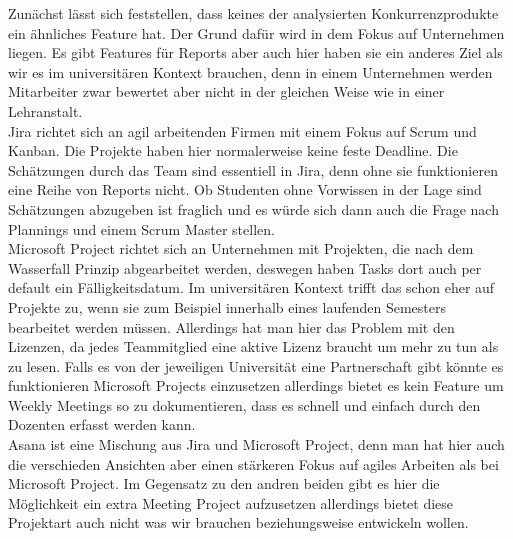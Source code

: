 Zunächst lässt sich feststellen, dass keines der analysierten Konkurrenzprodukte ein ähnliches Feature hat. Der Grund dafür wird in dem Fokus auf Unternehmen liegen. Es gibt Features für Reports aber auch hier haben sie ein anderes Ziel als wir es im universitären Kontext brauchen, denn in einem Unternehmen werden Mitarbeiter zwar bewertet aber nicht in der gleichen Weise wie in einer Lehranstalt.\\
Jira richtet sich an agil arbeitenden Firmen mit einem Fokus auf Scrum und Kanban. Die Projekte haben hier normalerweise keine feste Deadline. Die Schätzungen durch das Team sind essentiell in Jira, denn ohne sie funktionieren eine Reihe von Reports nicht. Ob Studenten ohne Vorwissen in der Lage sind Schätzungen abzugeben ist fraglich und es würde sich dann auch die Frage 
nach Plannings und einem Scrum Master stellen.\\
Microsoft Project richtet sich an Unternehmen mit Projekten, die nach dem Wasserfall Prinzip abgearbeitet werden, deswegen haben Tasks dort auch per default ein Fälligkeitsdatum. Im universitären Kontext trifft das schon eher auf Projekte zu, wenn sie zum Beispiel innerhalb eines laufenden Semesters bearbeitet werden müssen.  Allerdings hat man hier das Problem mit den Lizenzen, da jedes Teammitglied eine aktive Lizenz braucht um mehr zu tun als zu lesen. Falls es von der jeweiligen Universität eine Partnerschaft gibt könnte es funktionieren Microsoft Projects einzusetzen allerdings bietet es kein Feature um Weekly Meetings so zu dokumentieren, dass es schnell und einfach durch den Dozenten erfasst werden kann.\\
Asana ist eine Mischung aus Jira und Microsoft Project, denn man hat hier auch die verschieden Ansichten aber einen stärkeren Fokus auf agiles Arbeiten als bei Microsoft Project. Im Gegensatz zu den andren beiden gibt es hier die Möglichkeit ein extra Meeting Project aufzusetzen allerdings bietet diese Projektart auch nicht was wir brauchen beziehungsweise entwickeln wollen. 
